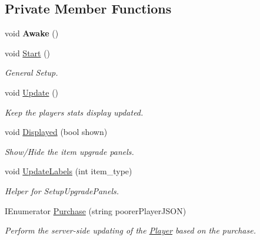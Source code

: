 \subsection*{Private Member Functions}
\begin{DoxyCompactItemize}
\item 
\mbox{\label{class_inventory_a88da279faf84d529af011f7e25bea01b}} 
void {\bfseries Awake} ()
\item 
\mbox{\label{class_inventory_aa5a9d430aff1ecd12a75901608d337ea}} 
void \mbox{\hyperlink{class_inventory_aa5a9d430aff1ecd12a75901608d337ea}{Start}} ()
\begin{DoxyCompactList}\small\item\em General Setup. \end{DoxyCompactList}\item 
\mbox{\label{class_inventory_a7b1e7148da0c7b5e4d87b6ea07dce086}} 
void \mbox{\hyperlink{class_inventory_a7b1e7148da0c7b5e4d87b6ea07dce086}{Update}} ()
\begin{DoxyCompactList}\small\item\em Keep the player\textquotesingle{}s stats display updated. \end{DoxyCompactList}\item 
\mbox{\label{class_inventory_a6a6906197f22590ffa086d4aca935dc3}} 
void \mbox{\hyperlink{class_inventory_a6a6906197f22590ffa086d4aca935dc3}{Displayed}} (bool shown)
\begin{DoxyCompactList}\small\item\em Show/\+Hide the item upgrade panels. \end{DoxyCompactList}\item 
\mbox{\label{class_inventory_a5ff170daf3d949c611d8e064626524e2}} 
void \mbox{\hyperlink{class_inventory_a5ff170daf3d949c611d8e064626524e2}{Update\+Labels}} (int item\+\_\+type)
\begin{DoxyCompactList}\small\item\em Helper for Setup\+Upgrade\+Panels. \end{DoxyCompactList}\item 
\mbox{\label{class_inventory_a6be0d5d14468b2eb9cba732c3f65c3e5}} 
I\+Enumerator \mbox{\hyperlink{class_inventory_a6be0d5d14468b2eb9cba732c3f65c3e5}{Purchase}} (string poorer\+Player\+J\+S\+ON)
\begin{DoxyCompactList}\small\item\em Perform the server-\/side updating of the \mbox{\hyperlink{class_player}{Player}} based on the purchase. \end{DoxyCompactList}\end{DoxyCompactItemize}
